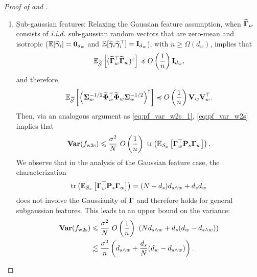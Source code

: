 \begin{proof}[Proof of  and ]
\begin{enumerate}[label=(\alph*)]
        \item \b{Sub-gaussian features}: Relaxing the Gaussian feature assumption, when $\widetilde{\boldsymbol{\Gamma}}_w$ consists of $\emph{i.i.d.}$ sub-gaussian random vectors that are zero-mean and isotropic (\ie $\mathbb{E}[\widetilde{\boldsymbol{\gamma}}_i] = \textbf0_{d_w}$ and $\mathbb{E}[\widetilde{\boldsymbol{\gamma}}_i \widetilde{\boldsymbol{\gamma}}_i^\top] = \mathbf{I}_{d_w}$), with $n \ge \Omega(d_w)$,  implies that
        \begin{align*}
            \mathbb{E}_{\widetilde{{\mathcal{S}}}}\left[(\widetilde{\boldsymbol{\Gamma}}_w^\top \widetilde{\boldsymbol{\Gamma}}_w)^\dagger\right] \preccurlyeq O\left(\frac{1}{n}\right) \mathbf{I}_{d_w},
        \end{align*}
        and therefore,
        \begin{align*}
            \mathbb{E}_{\widetilde{{\mathcal{S}}}}\left[\left(\boldsymbol{\Sigma}_w^{-1/2} \widetilde{\boldsymbol{\Phi}}_w^\top \widetilde{\boldsymbol{\Phi}}_w \boldsymbol{\Sigma}_w^{-1/2}\right)^\dagger\right] \preccurlyeq O\left(\frac{1}{n}\right) \mathbf{V}_w \mathbf{V}_w^\top.
        \end{align*}
        Then, via an analogous argument as \eqref{eq:pf_var_w2s_1}, \eqref{eq:pf_var_w2s} implies that 
        \begin{align}\label{eq:pf_var_w2s_2}
        \begin{split}
            \vari(f_\wts) \le \frac{\sigma^2}{N}\ O\rbr{\frac{1}{n}}\ \tr\rbr{\E_{\Scal_x}\sbr{\Gammab_w^\top \Pb_s \Gammab_w}}.
        \end{split}
        \end{align}
        We observe that in the analysis of the Gaussian feature case, the characterization
        \begin{align*}
            \mathop{\mathrm{tr}}\left(\mathbb{E}_{{\mathcal{S}}_x}\left[\boldsymbol{\Gamma}_w^\top \mathbf{P}_s \boldsymbol{\Gamma}_w\right]\right) = (N - d_s) d_{s \wedge w} + d_s d_w
        \end{align*}
        does not involve the Gaussianity of $\boldsymbol{\Gamma}$ and therefore holds for general subgaussian features.
        This leads to an upper bound on the variance:
        \begin{align*}
            \mathbf{Var}(f_{\mathrm{w2s}}) 
            &\leqslant \frac{\sigma^2}{N}\ O\left(\frac{1}{n}\right)\ \left(N d_{s \wedge w} + d_s (d_w - d_{s \wedge w})\right) \\
            &\lesssim \frac{\sigma^2}{n} \left(d_{s \wedge w} + \frac{d_s}{N} (d_w - d_{s \wedge w})\right).
        \end{align*}
    \end{enumerate}
\end{proof}


